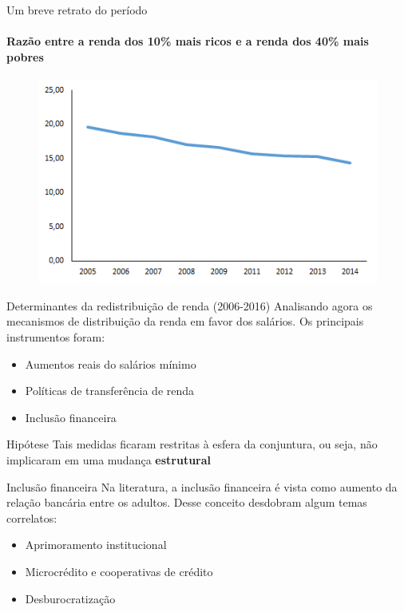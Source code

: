\documentclass[pdf, xcolor=table]{beamer}
\begin{document}
\begin{frame}{Um breve retrato do período}
\framesubtitle{Razão entre a renda dos 10\% mais ricos e a renda dos 40\% mais pobres}
\begin{figure}
    \centering
    \label{plot_Percentil}
    \includegraphics[width=0.8\paperwidth,height=0.8\paperheight]{Plot_Percentil_Rel.png}
\end{figure}
\end{frame}


\begin{frame}{Determinantes da redistribuição de renda (2006-2016)}
Analisando agora os mecanismos de distribuição da renda em favor dos salários. Os principais instrumentos foram:
    \begin{itemize}
        \item Aumentos reais do salários mínimo
        \item Políticas de transferência de renda
        \item \alert{Inclusão financeira}
    \end{itemize}
\vspace{1cm}

\begin{block}{Hipótese}    
Tais medidas ficaram restritas à esfera da conjuntura, ou seja, não implicaram em uma mudança \textbf{estrutural}
\end{block}
\end{frame}

\begin{frame}{Inclusão financeira}
Na literatura, a inclusão financeira é vista como aumento da relação bancária entre os adultos. Desse conceito desdobram algum temas correlatos:
\begin{itemize}
	\item Aprimoramento institucional
	\item Microcrédito e cooperativas de crédito
	\item Desburocratização
\end{itemize}
    
\end{frame}
\end{document}
